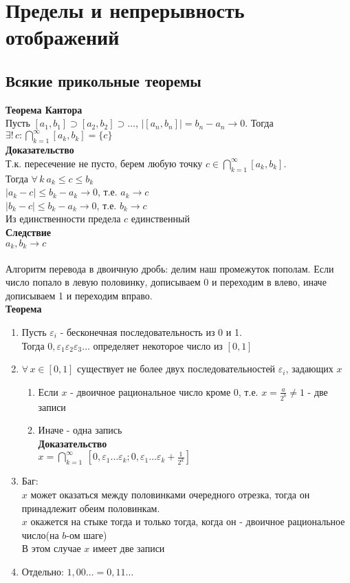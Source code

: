 \documentclass[12pt]{article}
\begin{document}
\section{Пределы и непрерывность отображений}
\subsection{Всякие прикольные теоремы}
\textbf{Теорема Кантора}\\
Пусть $[a_1, b_1] \supset [a_2, b_2] \supset \ldots$, $|[a_n,b_n]| = b_n-a_n \rightarrow 0$. Тогда $\exists!\, c: \bigcap_{k=1}^\infty [a_k,b_k] = \{c\}$\\
\textbf{Доказательство}\\
Т.к. пересечение не пусто, берем любую точку $c \in \bigcap_{k=1}^\infty [a_k,b_k]$.\\
Тогда $\forall\,k\ a_k\leq c \leq b_k$\\
$|a_k-c|\leq b_k-a_k \rightarrow 0$, т.е. $a_k\rightarrow c$\\
$|b_k-c|\leq b_k-a_k \rightarrow 0$, т.е. $b_k\rightarrow c$\\
Из единственности предела $c$ единственный\\
\textbf{Следствие}\\
$a_k, b_k \rightarrow c$\\\\
Алгоритм перевода в двоичную дробь: делим наш промежуток пополам. Если число попало в левую половинку, дописываем 0 и переходим в влево, иначе дописываем 1 и переходим вправо.\\
\textbf{Теорема}
\begin{enumerate}
    \item Пусть $\varepsilon_i$ - бесконечная последовательность из 0 и 1.\\
    Тогда $0,\varepsilon_1\varepsilon_2\varepsilon_3\ldots$ определяет некоторое число из $[0,1]$
    \item $\forall\,x\in [0,1]$ существует не более двух последовательностей $\varepsilon_i$, задающих $x$
    \begin{enumerate}
        \item Если $x$ - двоичное рациональное число кроме 0, т.е. $x = \frac a{2^b} \neq 1$ - две записи
        \item Иначе - одна запись\\
        \textbf{Доказательство}\\
    $x = \bigcap_{k=1}^\infty\ [0,\varepsilon_1\ldots\varepsilon_k; 0,\varepsilon_1\ldots\varepsilon_k+\frac{1}{2^k}]$
    \end{enumerate}
    \item Баг:\\
    $x$ может оказаться между половинками очередного отрезка, тогда он принадлежит обеим половинкам.\\
    $x$ окажется на стыке тогда и только тогда, когда он - двоичное рациональное число(на $b$-ом шаге)\\
    В этом случае $x$ имеет две записи
    \item Отдельно:
    $1,00\ldots = 0,11\ldots$
\end{enumerate}
\end{document}
